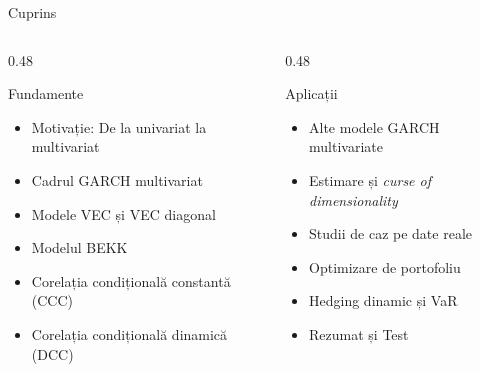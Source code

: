 \documentclass[9pt, aspectratio=169, t]{beamer}
\begin{document}
\begin{frame}{Cuprins}
    \vspace{-0.3cm}
    {\small
    \begin{columns}[T]
        \begin{column}{0.48\textwidth}
            \begin{block}{Fundamente}
                \begin{itemize}\setlength{\itemsep}{3pt}
                    \item Motivație: De la univariat la multivariat
                    \item Cadrul GARCH multivariat
                    \item Modele VEC și VEC diagonal
                    \item Modelul BEKK
                    \item Corelația condițională constantă (CCC)
                    \item Corelația condițională dinamică (DCC)
                \end{itemize}
            \end{block}
        \end{column}
        \begin{column}{0.48\textwidth}
            \begin{exampleblock}{Aplicații}
                \begin{itemize}\setlength{\itemsep}{3pt}
                    \item Alte modele GARCH multivariate
                    \item Estimare și \textit{curse of dimensionality}
                    \item Studii de caz pe date reale
                    \item Optimizare de portofoliu
                    \item Hedging dinamic și VaR
                    \item Rezumat și Test
                \end{itemize}
            \end{exampleblock}
        \end{column}
    \end{columns}
    }
\end{frame}

\end{document}
